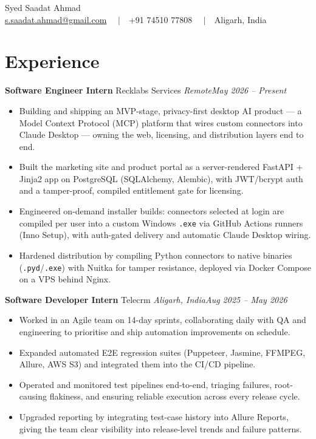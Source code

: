 \documentclass[10pt,letterpaper]{article}
\newcommand{\sep}{\,\textbullet\,}
\newcommand{\entry}[4]{%
  \textbf{#1}\sep #2\sep \textit{#3}\hfill\textit{#4}\par}
\begin{document}
\begin{center}
  {\Huge Syed Saadat Ahmad}\\[3pt]
  {\small \href{mailto:s.saadat.ahmad@gmail.com}{s.saadat.ahmad@gmail.com}
   \ \ $|$\ \ +91 74510 77808 \ \ $|$\ \ Aligarh, India}
\end{center}

\section*{Experience}

\entry{Software Engineer Intern}{Recklabs Services}{Remote}{May 2026 -- Present}
\begin{itemize}
  \item Building and shipping an MVP-stage, privacy-first desktop AI product --- a Model Context Protocol (MCP) platform that wires custom connectors into Claude Desktop --- owning the web, licensing, and distribution layers end to end.
  \item Built the marketing site and product portal as a server-rendered FastAPI + Jinja2 app on PostgreSQL (SQLAlchemy, Alembic), with JWT/bcrypt auth and a tamper-proof, compiled entitlement gate for licensing.
  \item Engineered on-demand installer builds: connectors selected at login are compiled per user into a custom Windows \texttt{.exe} via GitHub Actions runners (Inno Setup), with auth-gated delivery and automatic Claude Desktop wiring.
  \item Hardened distribution by compiling Python connectors to native binaries (\texttt{.pyd}/\texttt{.exe}) with Nuitka for tamper resistance, deployed via Docker Compose on a VPS behind Nginx.
\end{itemize}

\entry{Software Developer Intern}{Telecrm}{Aligarh, India}{Aug 2025 -- May 2026}
\begin{itemize}
  \item Worked in an Agile team on 14-day sprints, collaborating daily with QA and engineering to prioritise and ship automation improvements on schedule.
  \item Expanded automated E2E regression suites (Puppeteer, Jasmine, FFMPEG, Allure, AWS S3) and integrated them into the CI/CD pipeline.
  \item Operated and monitored test pipelines end-to-end, triaging failures, root-causing flakiness, and ensuring reliable execution across every release cycle.
  \item Upgraded reporting by integrating test-case history into Allure Reports, giving the team clear visibility into release-level trends and failure patterns.
\end{itemize}
\end{document}
